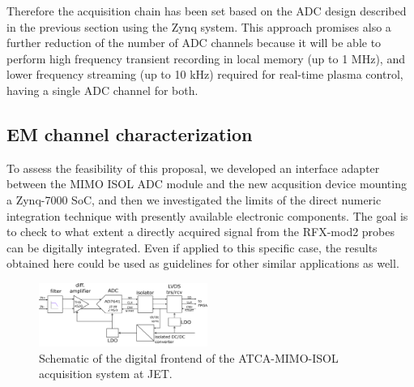 Therefore the acquisition chain has been set based on the ADC design described in the previous section using the Zynq system. This approach promises also a further reduction of the number of ADC channels because it will be able to perform high frequency transient recording in local memory (up to 1 MHz), and lower frequency streaming (up to 10 kHz) required for real-time plasma control, having a single ADC channel for both.




\subsection*{EM channel characterization}

To assess the feasibility of this proposal, we developed an interface adapter between the MIMO ISOL ADC module and the new acqusition device mounting a Zynq-7000 SoC, and then we investigated the limits of the direct numeric integration technique with presently available electronic components.
The goal is to check to what extent a directly acquired signal from the RFX-mod2 probes can be digitally integrated. Even if applied to this specific case, the results obtained here could be used as guidelines for other similar applications as well. 

\begin{figure}
    \centering
    \includegraphics[width=0.49\textwidth]{img/4_EmbeddedML/ATCA_MIMO_ISOL_schema.png}
    \caption{Schematic of the digital frontend of the ATCA-MIMO-ISOL acquisition system at JET.}
    \label{fig:portoghese_schema}
\end{figure}

